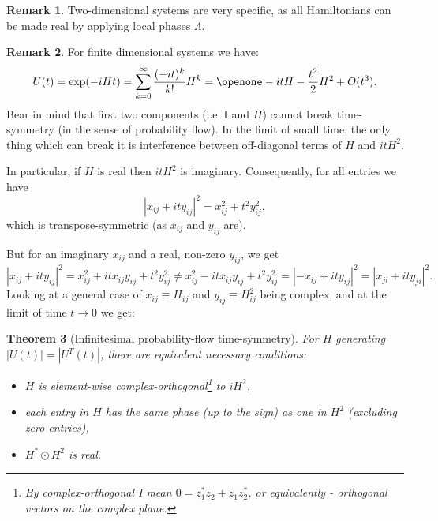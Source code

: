 \documentclass[aps,pra,12pt,nofootinbib,superscriptaddress,longbibliography,showpacs]{revtex4-1}
\theoremstyle{plain}
\newtheorem{theorem}{Theorem}   %
\theoremstyle{definition}
\newtheorem{remark}[theorem]{Remark}
\newcommand{\hprod}{\odot}
\newcommand{\I}{\openone}     %
\begin{document}
\begin{remark}
Two-dimensional systems are very specific, as all Hamiltonians can be made real by applying local phases $\Lambda.$
\end{remark}

\begin{remark}
For finite dimensional systems we have:
\begin{align}
U(t) = \exp(-iHt)
= \sum_{k=0}^\infty \frac{(-it)^k}{k!} H^k
= \I - i t H - \frac{t^2}{2} H^2+ O(t^3).
\end{align}
Bear in mind that first two components (i.e. $\mathbb{I}$ and $H$) cannot break time-symmetry (in the sense of probability flow). In the limit of small time, the only thing which can break it is interference between off-diagonal terms of $H$ and $i t H^2$.

In particular, if $H$ is real then $i t H^2$ is imaginary. Consequently, for all entries we have
\begin{equation}
|x_{ij} + i t y_{ij}|^2 =  x_{ij}^2 + t^2 y_{ij}^2,
\end{equation}
which is transpose-symmetric (as $x_{ij}$ and $y_{ij}$ are).

But for an imaginary $x_{ij}$ and a real, non-zero $y_{ij}$, we get
\begin{equation}
|x_{ij} + i t y_{ij}|^2 =  x_{ij}^2 + i t x_{ij} y_{ij} + t^2 y_{ij}^2
\neq x_{ij}^2 - i t x_{ij} y_{ij} + t^2 y_{ij}^2
= |-x_{ij} + i t y_{ij}|^2
= |x_{ji} + i t y_{ji}|^2.
\end{equation}
Looking at a general case of $x_{ij}\equiv H_{ij}$ and $y_{ij} \equiv H^2_{ij}$ being complex, and at the limit of time $t\rightarrow0$ we get:
\end{remark}

\begin{theorem}[Infinitesimal probability-flow time-symmetry]
For $H$ generating $|U(t)|=|U^T(t)|$, there are equivalent necessary conditions:
\begin{itemize}
\item $H$ is element-wise complex-orthogonal\footnote{By complex-orthogonal
I mean $0 = z_1^* z_2 +z_1 z_2^*$,
or equivalently - orthogonal vectors on the complex plane.}
 to $i H^2$,
\item each entry in $H$ has the same phase (up to the sign) as one in $H^2$ (excluding zero entries),
\item $H^* \hprod H^2$ is real.
\end{itemize}

\end{theorem}
\end{document}
